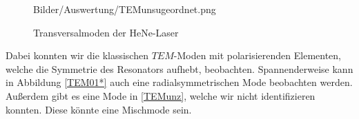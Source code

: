 \begin{figure}[ht]
{      {Bilder/Auswertung/TEMunsugeordnet.png}}
      \caption{Transversalmoden der HeNe-Laser}
      \label{bild:Moden}
  \end{figure}

  Dabei konnten wir die klassischen $TEM$-Moden mit polarisierenden Elementen, welche die Symmetrie des Resonators aufhebt, beobachten.
  Spannenderweise kann in Abbildung \ref{TEM01*} auch eine radialsymmetrischen Mode beobachten werden. Außerdem
  gibt es eine Mode in \ref{TEMunz}, welche wir nicht identifizieren konnten. Diese könnte eine Mischmode sein.
